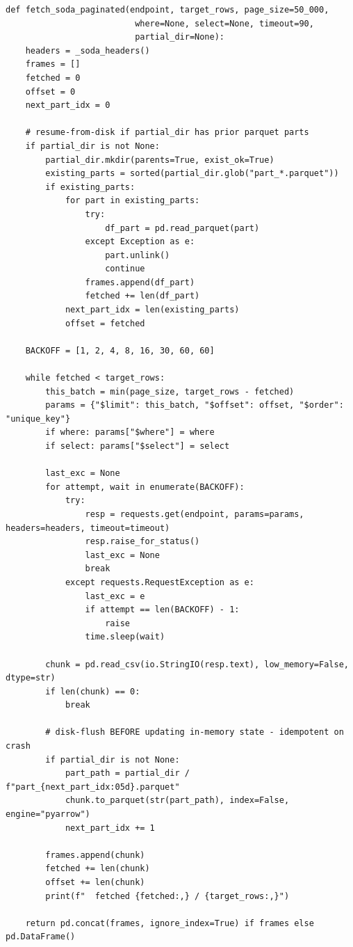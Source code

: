 \documentclass[11pt,letterpaper]{book}
\begin{document}
\begin{lstlisting}
def fetch_soda_paginated(endpoint, target_rows, page_size=50_000,
                          where=None, select=None, timeout=90,
                          partial_dir=None):
    headers = _soda_headers()
    frames = []
    fetched = 0
    offset = 0
    next_part_idx = 0

    # resume-from-disk if partial_dir has prior parquet parts
    if partial_dir is not None:
        partial_dir.mkdir(parents=True, exist_ok=True)
        existing_parts = sorted(partial_dir.glob("part_*.parquet"))
        if existing_parts:
            for part in existing_parts:
                try:
                    df_part = pd.read_parquet(part)
                except Exception as e:
                    part.unlink()
                    continue
                frames.append(df_part)
                fetched += len(df_part)
            next_part_idx = len(existing_parts)
            offset = fetched

    BACKOFF = [1, 2, 4, 8, 16, 30, 60, 60]

    while fetched < target_rows:
        this_batch = min(page_size, target_rows - fetched)
        params = {"$limit": this_batch, "$offset": offset, "$order": "unique_key"}
        if where: params["$where"] = where
        if select: params["$select"] = select

        last_exc = None
        for attempt, wait in enumerate(BACKOFF):
            try:
                resp = requests.get(endpoint, params=params, headers=headers, timeout=timeout)
                resp.raise_for_status()
                last_exc = None
                break
            except requests.RequestException as e:
                last_exc = e
                if attempt == len(BACKOFF) - 1:
                    raise
                time.sleep(wait)

        chunk = pd.read_csv(io.StringIO(resp.text), low_memory=False, dtype=str)
        if len(chunk) == 0:
            break

        # disk-flush BEFORE updating in-memory state - idempotent on crash
        if partial_dir is not None:
            part_path = partial_dir / f"part_{next_part_idx:05d}.parquet"
            chunk.to_parquet(str(part_path), index=False, engine="pyarrow")
            next_part_idx += 1

        frames.append(chunk)
        fetched += len(chunk)
        offset += len(chunk)
        print(f"  fetched {fetched:,} / {target_rows:,}")

    return pd.concat(frames, ignore_index=True) if frames else pd.DataFrame()
\end{lstlisting}
\end{document}
